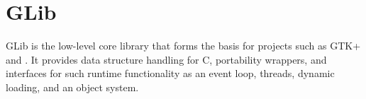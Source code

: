 
\section[GLib]{GLib\cite{website:glib}}\label{sec:GLib}

GLib is the low-level core library that forms the basis for projects such as GTK+ and \GNOME. It provides data structure handling for C, portability wrappers, and interfaces for such runtime functionality as an event loop, threads, dynamic loading, and an object system.
